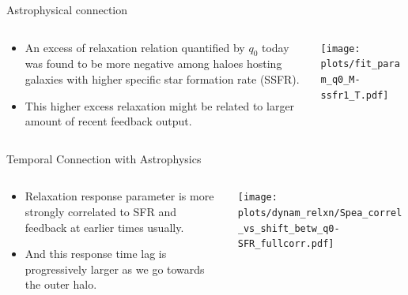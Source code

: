 \documentclass{beamer}
\begin{document}
\begin{frame}{Astrophysical connection}
    \begin{columns}
        \begin{column}{0.5\linewidth}
            \begin{itemize}
                \item An excess of relaxation relation quantified by $q_0$ today was found to be more negative among haloes hosting galaxies with higher specific star formation rate (SSFR).
                \item This higher excess relaxation might be related to larger amount of recent feedback output.
            \end{itemize}
        \end{column}
        \begin{column}{0.49\linewidth}
            \begin{center}
                \texttt{[image: plots/fit\_param\_q0\_M-ssfr1\_T.pdf]}
            \end{center}
        \end{column}
    \end{columns} 
        
\end{frame}

\begin{frame}{Temporal Connection with Astrophysics}
\begin{columns}
\begin{column}{0.45\linewidth}
    \begin{itemize}
        \item Relaxation response parameter is more strongly correlated to SFR and feedback at earlier times usually.
        \item And this response time lag is progressively larger as we go towards the outer halo.
    \end{itemize}
\end{column}
\begin{column}{0.54\linewidth}
    \begin{center}
        \texttt{[image: plots/dynam\_relxn/Spea\_correl\_vs\_shift\_betw\_q0-SFR\_fullcorr.pdf]}
    \end{center}
\end{column}
\end{columns} 
\end{frame}
\end{document}

